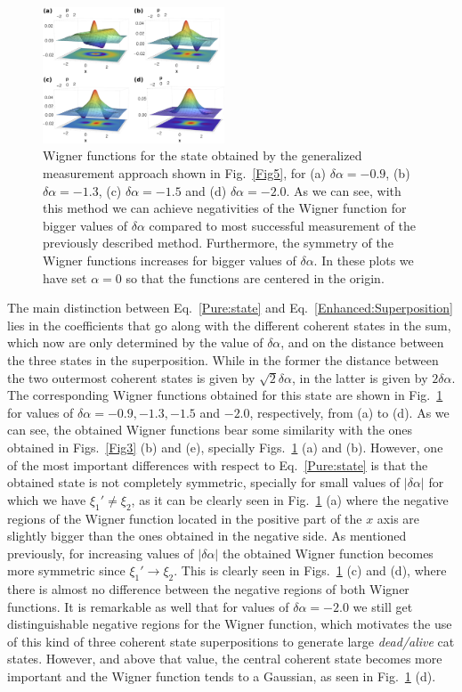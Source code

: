 \begin{figure}
    \centering
    \includegraphics[width =0.48\textwidth]{Fig6.pdf}
    \caption{Wigner functions for the state obtained by the generalized measurement approach shown in Fig.~\ref{Fig5}, for (a) $\delta \alpha = -0.9$, (b) $\delta \alpha = -1.3$, (c) $\delta \alpha = -1.5$ and (d) $\delta \alpha = -2.0$. As we can see, with this method we can achieve negativities of the Wigner function for bigger values of $\delta \alpha$ compared to most successful measurement of the previously described method. Furthermore, the symmetry of the Wigner functions increases for bigger values of $\delta \alpha$. In these plots we have set $\alpha = 0$ so that the functions are centered in the origin.}
    \label{Fig6}
\end{figure}

The main distinction between Eq.~\eqref{Pure:state} and Eq.~\eqref{Enhanced:Superposition} lies in the coefficients that go along with the different coherent states in the sum, which now are only determined by the value of $\delta \alpha$, and on the distance between the three states in the superposition. While in the former the distance between the two outermost coherent states is given by $\sqrt{2} \delta \alpha$, in the latter is given by $2\delta \alpha$. The corresponding Wigner functions obtained for this state are shown in Fig.~\ref{Fig6} for values of $\delta \alpha = -0.9, -1.3, -1.5$ and $-2.0$, respectively, from (a) to (d). As we can see, the obtained Wigner functions bear some similarity with the ones obtained in Figs.~\ref{Fig3} (b) and (e), specially Figs.~\ref{Fig6} (a) and (b). However, one of the most important differences with respect to Eq.~\eqref{Pure:state} is that the obtained state is not completely symmetric, specially for small values of $|\delta \alpha|$ for which we have $\xi_1' \neq \xi_2$, as it can be clearly seen in Fig.~\ref{Fig6} (a) where the negative regions of the Wigner function located in the positive part of the $x$ axis are slightly bigger than the ones obtained in the negative side. As mentioned previously, for increasing values of $|\delta \alpha|$ the obtained Wigner function becomes more symmetric since $\xi_1' \to \xi_2$. This is clearly seen in Figs.~\ref{Fig6} (c) and (d), where there is almost no difference between the negative regions of both Wigner functions. It is remarkable as well that for values of $\delta \alpha = -2.0$ we still get distinguishable negative regions for the Wigner function, which motivates the use of this kind of three coherent state superpositions to generate large \emph{dead/alive} cat states. However, and above that value, the central coherent state becomes more important and the Wigner function tends to a Gaussian, as seen in Fig.~\ref{Fig6} (d).

